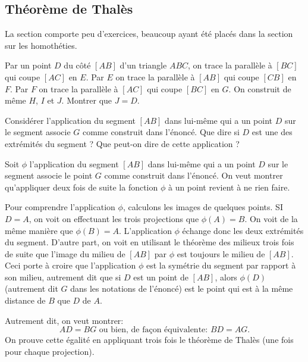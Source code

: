 \subsection{Théorème de Thalès}


La section comporte peu d'exercices, beaucoup ayant été placés dans la section sur les homothéties.

\begin{exo}
Par un point $D$ du côté $[AB]$ d'un triangle $ABC$, on trace la parallèle à $[BC]$ qui coupe $[AC]$ en $E$.
Par $E$ on trace la parallèle à $[AB]$ qui coupe $[CB]$ en $F$.
Par $F$ on trace la parallèle à $[AC]$ qui coupe $[BC]$ en $G$.
On construit de même $H$, $I$ et $J$. Montrer que $J=D$.
\begin{hint} Considérer l'application du segment $[AB]$ dans lui-même qui a un point $D$ sur le segment associe $G$ comme construit dans l'énoncé. Que dire si $D$ est une des extrémités du segment ? Que peut-on dire de cette application ? %
\end{hint}

\begin{sol}
Soit $\phi$ l'application du segment $[AB]$ dans lui-même qui a un point $D$ sur le segment associe le point $G$ comme construit dans l'énoncé. On veut montrer qu'appliquer deux fois de suite la fonction $\phi$ à un point revient à ne rien faire. 

Pour comprendre l'application $\phi$, calculons les images de quelques points.
SI $D=A$, on voit on effectuant les trois projections que $\phi(A)=B$. On voit de la même manière que $\phi(B)=A$. L'application $\phi$ échange donc les deux extrémités du segment. D'autre part, on voit en utilisant le théorème des milieux trois fois de suite que l'image du milieu de $[AB]$ par $\phi$ est toujours le milieu de $[AB]$. Ceci porte à croire que l'application $\phi$ est la symétrie du segment par rapport à son milieu, autrement dit que si $D$ est un point de $[AB]$, alors $\phi(D)$ (autrement dit $G$ dans les notations de l'énoncé) est le point qui est à la même distance de $B$ que $D$ de $A$. 

Autrement dit, on veut montrer:
\[ AD=BG\text{ ou bien, de façon équivalente: } BD =AG.\]
On prouve cette égalité en appliquant trois fois le théorème de Thalès (une fois pour chaque projection).
\end{sol}
\end{exo}


